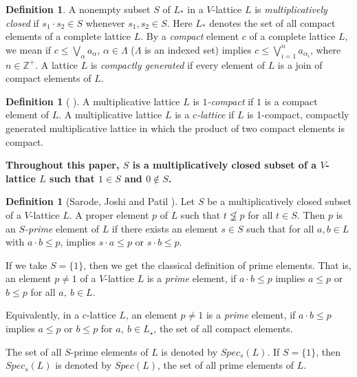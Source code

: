 \documentclass[10pt,twoside,a4]{amsart}
\numberwithin{equation}{section}
\theoremstyle{plain}
\theoremstyle{definition}
\newtheorem{defn}[lem]{Definition}
\begin{document}
		
		\begin{defn}
			A nonempty subset $S$ of $L_{*}$ in a $V$-lattice $L$ is \textit{multiplicatively closed} if $s_{1} \cdot s_{2} \in S$ whenever $s_{1}, s_{2} \in S$. Here    $L_{*}$ denotes the set of all compact elements of a complete lattice $ L $. By a \textit{compact} element $c$ of a complete lattice $ L $, we mean 
			if $ c \leq \bigvee_{\alpha} a_{\alpha} $, $\alpha \in \Lambda$
			($\Lambda$ is an indexed set) implies $ c \leq \bigvee _{i=1}^{n}
			a_{\alpha_{i}} $, where $ n \in \mathbb{Z}^{+} $. A lattice $L$ is \textit{compactly generated} if every
			element of $L$ is a join of compact elements of $L$.  
				\end{defn}
			\begin{defn} [ \cite{AAJ, A, SJ, WD}] A multiplicative lattice $L$ is \textit{$1$-compact} if $1$ is a compact element of $L$. A multiplicative lattice $L$ is a {\it $c$-lattice} if $L$ is 1-compact, compactly generated multiplicative lattice in which the product of two compact elements is compact. \end{defn}	
	
		

		 \textbf{Throughout this paper, $S$ is a multiplicatively closed subset of a $V$-lattice $L$ such that $1 \in S$ and $0 \notin S$.}
		
		
		\begin{defn}[Sarode, Joshi and Patil \cite{SJP}]
		Let $S$ be a multiplicatively closed subset of a $V$-lattice $L$. A proper element $p$ of $L$ such that $t \not\leqq p$ for all $t \in S$. Then $p$ is an { \it $S$-prime} element of $L$ if there exists an element $s \in S$ such that for all $a, b  \in L$ with $a \cdot b \leq p$, implies $s \cdot a \leq p$ or $s \cdot b \leq p$. 
			
		If we take $S=\{1\}$, then we get the classical definition of prime elements. That is, 	an element $p \neq 1$ of a $V$-lattice $L$  is a \textit{prime} element, if $a\cdot b \leq p$ implies $a \leq p$ or $b \leq p$ for all $a, ~b \in L$.  
		
		 Equivalently, in a $c$-lattice $L$, an element $p \neq 1$  is a \textit{prime} element, if $a\cdot b \leq p$ implies $a \leq p$ or $b \leq p$ for  $a, ~b \in L_{\star}$, the set of all compact elements.

		The set of all $S$-prime elements of $L$ is denoted by $Spec_s(L)$. If $S = \{1\}$, then $Spec_s(L)$ is denoted by $Spec(L)$, the set of all prime elements of $L$.
	\end{defn}
		
\end{document}

